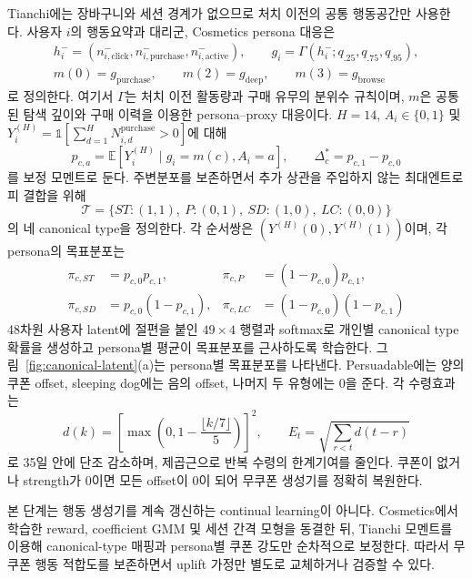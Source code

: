\documentclass[9pt,twocolumn]{extarticle}
\begin{document}
Tianchi에는 장바구니와 세션 경계가 없으므로 처치 이전의 공통 행동공간만 사용한다.
사용자 $i$의 행동요약과 대리군, Cosmetics persona 대응은
\begin{equation}
\begin{gathered}
h_i^-=(n_{i,\mathrm{click}}^-,n_{i,\mathrm{purchase}}^-,
n_{i,\mathrm{active}}^-),\qquad
g_i=\Gamma(h_i^-;q_{.25},q_{.75},q_{.95}),\\
m(0)=g_{\mathrm{purchase}},\qquad
m(2)=g_{\mathrm{deep}},\qquad
m(3)=g_{\mathrm{browse}}
\end{gathered}
\end{equation}
로 정의한다. 여기서 $\Gamma$는 처치 이전 활동량과 구매 유무의 분위수 규칙이며,
$m$은 공통된 탐색 깊이와 구매 이력을 이용한 persona--proxy 대응이다. $H=14$,
$A_i\in\{0,1\}$ 및 $Y_i^{(H)}=\mathbb{1}[\sum_{d=1}^{H}N_{i,d}^{\mathrm{purchase}}>0]$에 대해
\begin{equation}
p_{c,a}=\mathbb{E}[Y_i^{(H)}\mid g_i=m(c),A_i=a],\qquad
\Delta_c^*=p_{c,1}-p_{c,0}
\end{equation}
를 보정 모멘트로 둔다. 주변분포를 보존하면서 추가 상관을 주입하지 않는
최대엔트로피 결합을 위해
\begin{equation}
\mathcal T=\{ST:(1,1),\ P:(0,1),\ SD:(1,0),\ LC:(0,0)\}
\end{equation}
의 네 canonical type을 정의한다. 각 순서쌍은 $(Y^{(H)}(0),Y^{(H)}(1))$이며,
각 persona의 목표분포는
\begin{equation}
\begin{aligned}
\pi_{c,ST}&=p_{c,0}p_{c,1}, & \pi_{c,P}&=(1-p_{c,0})p_{c,1},\\
\pi_{c,SD}&=p_{c,0}(1-p_{c,1}), &
\pi_{c,LC}&=(1-p_{c,0})(1-p_{c,1})
\end{aligned}
\end{equation}
48차원 사용자 latent에 절편을 붙인 $49\times4$ 행렬과 softmax로 개인별 canonical
type 확률을 생성하고 persona별 평균이 목표분포를 근사하도록 학습한다.
그림~\ref{fig:canonical-latent}(a)는 persona별 목표분포를 나타낸다.
Persuadable에는 양의 쿠폰 offset, sleeping dog에는 음의
offset, 나머지 두 유형에는 0을 준다. 각 수령효과는
\begin{equation}
d(k)=\left[\max\left(0,1-\frac{\lfloor k/7\rfloor}{5}\right)\right]^2,
\qquad E_t=\sqrt{\sum_{r<t}d(t-r)}
\end{equation}
로 35일 안에 단조 감소하며, 제곱근으로 반복 수령의 한계기여를 줄인다. 쿠폰이 없거나
strength가 0이면 모든 offset이 0이 되어 무쿠폰 생성기를 정확히 복원한다.

본 단계는 행동 생성기를 계속 갱신하는 continual learning이 아니다. Cosmetics에서
학습한 reward, coefficient GMM 및 세션 간격 모형을 동결한 뒤, Tianchi 모멘트를
이용해 canonical-type 매핑과 persona별 쿠폰 강도만 순차적으로 보정한다. 따라서
무쿠폰 행동 적합도를 보존하면서 uplift 가정만 별도로 교체하거나 검증할 수 있다.
\end{document}
